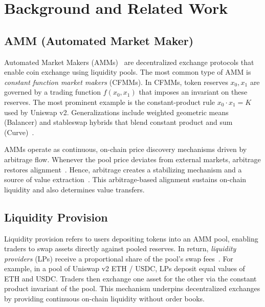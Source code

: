 \documentclass[anonymous]{lipics-v2021}
\begin{document}
\section{Background and Related Work}
\label{sec:background}

\subsection{AMM (Automated Market Maker)}
Automated Market Makers (AMMs)~\cite{hertzog2017bancor} are decentralized exchange protocols that enable coin exchange using liquidity pools. 
The most common type of AMM is \emph{constant function market makers} (CFMMs). In CFMMs, token reserves $x_0, x_1$ are governed by a trading function $f(x_0,x_1)$ that imposes an invariant on these reserves.
The most prominent example is the constant-product rule $x_0 \cdot x_1 = K$ used by Uniswap v2. Generalizations include weighted geometric means (Balancer) and stableswap hybrids that blend constant product and sum (Curve)~\cite{bartoletti2022theory}.

AMMs operate as continuous, on-chain price discovery mechanisms driven by arbitrage flow. Whenever the pool price deviates from external markets, arbitrage restores alignment~\cite{angeris2020improved}. 
Hence, arbitrage creates a stabilizing mechanism and a source of value extraction~\cite{pusceddu2024lean}.
This arbitrage-based alignment sustains on-chain liquidity and also determines value transfers. %

\subsection{Liquidity Provision}
\label{sec:liquidity-provision}

Liquidity provision refers to users depositing tokens into an AMM pool, enabling traders to swap assets directly against pooled reserves. In return, \textit{liquidity providers} (LPs) receive a proportional share of the pool’s swap fees~\cite{gogol2024sok, chiu2023fragility, saengchote2023decentralized}.
For example, in a pool of Uniswap v2 ETH / USDC, LPs deposit equal values of ETH and USDC. Traders then exchange one asset for the other via the constant product invariant of the pool. This mechanism underpins decentralized exchanges by providing continuous on-chain liquidity without order books.
\end{document}

